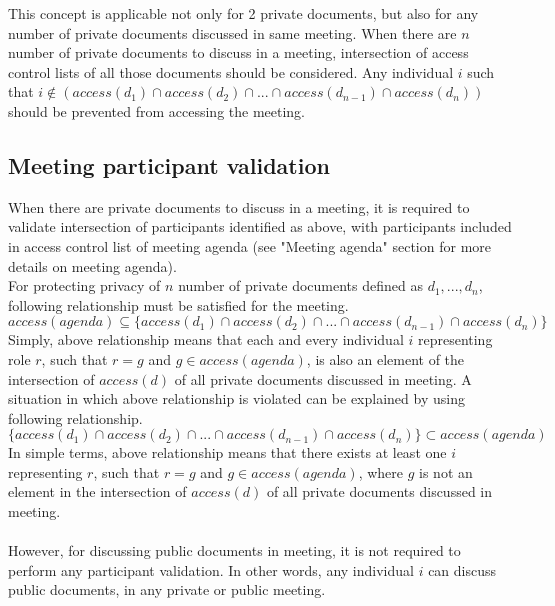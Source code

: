 \documentclass{article}
\begin{document}
\noindent
This concept is applicable not only for 2 private documents, but also for any number of private documents discussed in same meeting. When there are $n$ number of private documents to discuss in a meeting, intersection of access control lists of all those documents should be considered. Any individual $i$ such that $i \notin (access(d_{1}) \cap access(d_{2}) \cap ... \cap access(d_{n-1}) \cap access(d_{n}))$ should be prevented from accessing the meeting.
\subsection{Meeting participant validation}
\noindent
When there are private documents to discuss in a meeting, it is required to validate intersection of participants identified as above, with participants included in access control list of meeting agenda (see "Meeting agenda" section for more details on meeting agenda).\\ 
For protecting privacy of $n$ number of private documents defined as $d_{1}, ... , d_{n}$, following relationship must be satisfied for the meeting. 
\[ access(agenda) \subseteq \{access(d_{1}) \cap access(d_{2}) \cap ... \cap access(d_{n-1}) \cap access(d_{n})\} \]
\noindent
Simply, above relationship means that each and every individual $i$ representing role $r$, such that $r = g$ and $g \in access(agenda)$, is also an element of the intersection of $access(d)$ of all private documents discussed in meeting.
A situation in which above relationship is violated can be explained by using following relationship. 
\[ \{access(d_{1}) \cap access(d_{2}) \cap ... \cap access(d_{n-1}) \cap access(d_{n})\} \subset access(agenda) \]
In simple terms, above relationship means that there exists at least one $i$ representing $r$, such that $r = g$ and $g \in access(agenda)$, where $g$ is not an element in the intersection of $access(d)$ of all private documents discussed in meeting.\\ \\
\noindent
However, for discussing public documents in meeting, it is not required to perform any participant validation. In other words, any individual $i$ can discuss public documents, in any private or public meeting.


\end{document}
